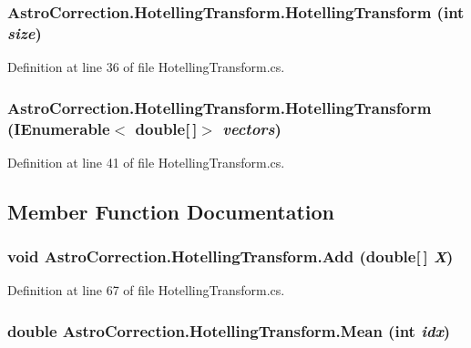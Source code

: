 \subsubsection[{HotellingTransform}]{\setlength{\rightskip}{0pt plus 5cm}AstroCorrection.HotellingTransform.HotellingTransform (int {\em size})}\label{class_astro_correction_1_1_hotelling_transform_abc13063ff1f6b757524d4f18de7b50a2}


Definition at line 36 of file HotellingTransform.cs.
\subsubsection[{HotellingTransform}]{\setlength{\rightskip}{0pt plus 5cm}AstroCorrection.HotellingTransform.HotellingTransform (IEnumerable$<$ double[$\,$]$>$ {\em vectors})}\label{class_astro_correction_1_1_hotelling_transform_ac3a759dac4bbd72897aea286520f3b41}


Definition at line 41 of file HotellingTransform.cs.

\subsection{Member Function Documentation}
\subsubsection[{Add}]{\setlength{\rightskip}{0pt plus 5cm}void AstroCorrection.HotellingTransform.Add (double[$\,$] {\em X})}\label{class_astro_correction_1_1_hotelling_transform_ad78364d0eac5bd4429f02db95aef7ebe}


Definition at line 67 of file HotellingTransform.cs.
\subsubsection[{Mean}]{\setlength{\rightskip}{0pt plus 5cm}double AstroCorrection.HotellingTransform.Mean (int {\em idx})}\label{class_astro_correction_1_1_hotelling_transform_a0dc476137dec9835b7b2c9e33b5bf012}


